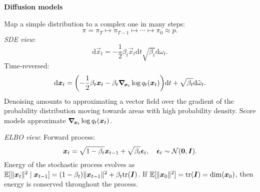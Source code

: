 \documentclass[10pt]{article}
\newenvironment{topic}[1]
{\textbf{\sffamily \colorbox{black}{\rlap{\textbf{\textcolor{white}{#1}}}\hspace{\linewidth}\hspace{-2\fboxsep}}}}
{}
\newenvironment{subtopic}[1]
{\begin{center}\textbf{\sffamily #1}\end{center}}
{}
\begin{document}
\begin{multicols*}{3}
\begin{topic}{Generative models}
        \begin{subtopic}{Diffusion models}
            Map a simple distribution to a complex one in many steps: \[
                \pi = \pi_T \mapsto \pi_{T-1} \mapsto \cdots \mapsto \pi_0 \approx p.
            \]
            \textit{SDE view}: \[
                \mathrm{d}\vec{x}_t = -\frac{1}{2} \beta_t \vec{x}_t \mathrm{d}t \sqrt{\beta_t} \mathrm{d}\omega_t.
            \]
            Time-reversed: \[
                \mathrm{d}\vec{x}_t = \lft( -\frac{1}{2} \beta_t \vec{x}_t - \beta_t \grad{\log q_t(\vec{x}_t)}{\vec{x}_t} \rgt) \mathrm{d}t + \sqrt{\beta_t} \mathrm{d}\tilde{\omega}_t.
            \]
            Denoising amounts to approximating a vector field over the gradient of the probability distribution
            moving towards areas with high probability density. Score models approximate $\grad{\log
                    q_t(\vec{x}_t)}{\vec{x}_t}$.

            \textit{ELBO view}: Forward process: \[
                \vec{x}_t = \sqrt{1-\beta_t} \vec{x}_{t-1} + \sqrt{\beta_t} \vec{\epsilon}_t, \quad \vec{\epsilon}_t \sim \mathcal{N}(\vec{0}, \mat{I}).
            \]
            Energy of the stochastic process evolves as $\E[\| \vec{x}_t \|^2 \mid \vec{x}_{t-1}] =
                (1-\beta_t)\| \vec{x}_{t-1} \|^2 + \beta_t \mathrm{tr}(\mat{I})$. If $\E[\| \vec{x}_0 \|^2] =
                \mathrm{tr}(\mat{I}) = \dim(\vec{x}_0)$, then energy is conserved throughout the process.


\end{subtopic}
\end{topic}
\end{multicols*}
\end{document}
